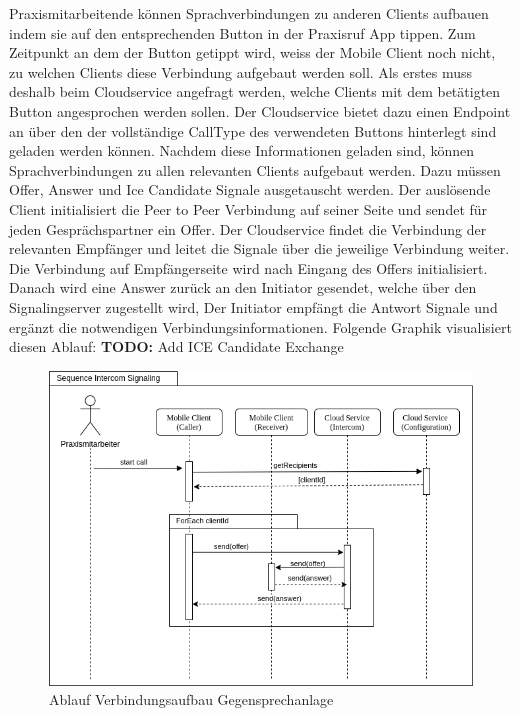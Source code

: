 Praxismitarbeitende können Sprachverbindungen zu anderen Clients aufbauen indem sie auf den entsprechenden Button in der Praxisruf App tippen.
Zum Zeitpunkt an dem der Button getippt wird, weiss der Mobile Client noch nicht, zu welchen Clients diese Verbindung aufgebaut werden soll.
Als erstes muss deshalb beim Cloudservice angefragt werden, welche Clients mit dem betätigten Button angesprochen werden sollen.
Der Cloudservice bietet dazu einen Endpoint an über den der vollständige CallType des verwendeten Buttons hinterlegt sind geladen werden können.
Nachdem diese Informationen geladen sind, können Sprachverbindungen zu allen relevanten Clients aufgebaut werden.
Dazu müssen Offer, Answer und Ice Candidate Signale ausgetauscht werden.
Der auslösende Client initialisiert die Peer to Peer Verbindung auf seiner Seite und sendet für jeden Gesprächspartner ein Offer.
Der Cloudservice findet die Verbindung der relevanten Empfänger und leitet die Signale über die jeweilige Verbindung weiter.
Die Verbindung auf Empfängerseite wird nach Eingang des Offers initialisiert.
Danach wird eine Answer zurück an den Initiator gesendet, welche über den Signalingserver zugestellt wird,
Der Initiator empfängt die Antwort Signale und ergänzt die notwendigen Verbindungsinformationen.
Folgende Graphik visualisiert diesen Ablauf:
\textbf{TODO: } Add ICE Candidate Exchange

\begin{figure}[h]
    \centering
    \begin{minipage}[b]{0.9\textwidth}
        \includegraphics[width=\textwidth]{graphics/diagramms/Sequence_Intercom_Broking_V02}
        \caption{Ablauf Verbindungsaufbau Gegensprechanlage}
    \end{minipage}
\end{figure}

